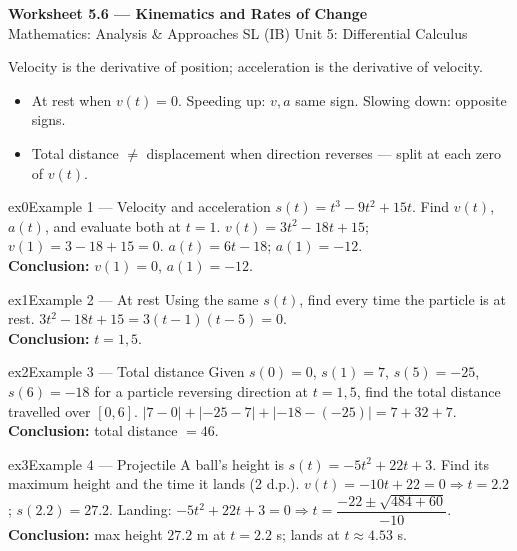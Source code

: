\documentclass[11pt]{article}
\begin{document}
\begin{center}
{\LARGE\bfseries\color{titleblue}Worksheet 5.6 --- Kinematics and Rates of Change}\\[2pt]
{\small Mathematics: Analysis \& Approaches SL (IB) \textperiodcentered{} Unit 5: Differential Calculus}
\end{center}

\begin{ideabox}
Velocity is the derivative of position; acceleration is the derivative of velocity.
\begin{itemize}[leftmargin=*,itemsep=2pt]
  \item At rest when $v(t)=0$. Speeding up: $v,a$ same sign. Slowing down: opposite signs.
  \item Total distance $\neq$ displacement when direction reverses --- split at each zero of $v(t)$.
\end{itemize}
\end{ideabox}


\begin{example}{ex0}{Example 1 --- Velocity and acceleration}
$s(t)=t^3-9t^2+15t$. Find $v(t)$, $a(t)$, and evaluate both at $t=1$.\soln
$v(t)=3t^2-18t+15$; $v(1)=3-18+15=0$. $a(t)=6t-18$; $a(1)=-12$.\\[3pt]\textbf{Conclusion:} $v(1)=0$, $a(1)=-12$.
\end{example}

\begin{example}{ex1}{Example 2 --- At rest}
Using the same $s(t)$, find every time the particle is at rest.\soln
$3t^2-18t+15=3(t-1)(t-5)=0$.\\[3pt]\textbf{Conclusion:} $t=1,5$.
\end{example}

\begin{example}{ex2}{Example 3 --- Total distance}
Given $s(0)=0$, $s(1)=7$, $s(5)=-25$, $s(6)=-18$ for a particle reversing direction at $t=1,5$, find the total distance travelled over $[0,6]$.\soln
$|7-0|+|-25-7|+|-18-(-25)|=7+32+7$.\\[3pt]\textbf{Conclusion:} total distance $=46$.
\end{example}

\begin{example}{ex3}{Example 4 --- Projectile}
A ball's height is $s(t)=-5t^2+22t+3$. Find its maximum height and the time it lands (2 d.p.).\soln
$v(t)=-10t+22=0\Rightarrow t=2.2$; $s(2.2)=27.2$. Landing: $-5t^2+22t+3=0\Rightarrow t=\dfrac{-22\pm\sqrt{484+60}}{-10}$.\\[3pt]\textbf{Conclusion:} max height $27.2$ m at $t=2.2$ s; lands at $t\approx4.53$ s.
\end{example}
\end{document}
